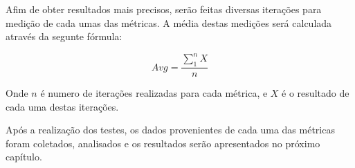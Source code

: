 Afim de obter resultados mais precisos, serão feitas diversas iterações para medição de cada umas das métricas. A média destas medições será calculada através da segunte fórmula: 

$$ Avg = \frac{\sum\limits_{1}^{n} X}{n} $$

Onde $n$ é numero de iterações realizadas para cada métrica, e $X$ é o resultado de cada uma destas iterações.

Após a realização dos testes, os dados provenientes de cada uma das métricas foram coletados, analisados e os resultados serão apresentados no próximo capítulo. 